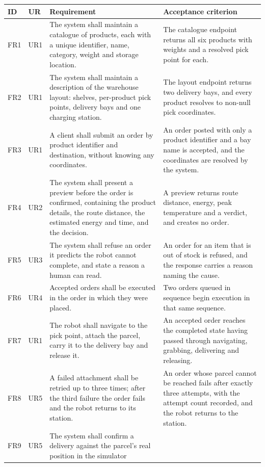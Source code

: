 \documentclass[12pt,a4paper]{report}
\begin{document}
\begin{longtable}{@{}p{}p{}p{}p{}@{}}
\toprule
\textbf{ID} & \textbf{UR} & \textbf{Requirement} & \textbf{Acceptance criterion} \\
\midrule
\endhead
FR1 & UR1 & The system shall maintain a catalogue of products, each with a unique identifier, name,
category, weight and storage location. & The catalogue endpoint returns all six products with
weights and a resolved pick point for each. \\
FR2 & UR1 & The system shall maintain a description of the warehouse layout: shelves, per-product
pick points, delivery bays and one charging station. & The layout endpoint returns two delivery
bays, and every product resolves to non-null pick coordinates. \\
FR3 & UR1 & A client shall submit an order by product identifier and destination, without knowing
any coordinates. & An order posted with only a product identifier and a bay name is accepted, and
the coordinates are resolved by the system. \\
FR4 & UR2 & The system shall present a preview before the order is confirmed, containing the
product details, the route distance, the estimated energy and time, and the decision. & A preview
returns route distance, energy, peak temperature and a verdict, and creates no order. \\
FR5 & UR3 & The system shall refuse an order it predicts the robot cannot complete, and state a
reason a human can read. & An order for an item that is out of stock is refused, and the response
carries a reason naming the cause. \\
FR6 & UR4 & Accepted orders shall be executed in the order in which they were placed. & Two orders
queued in sequence begin execution in that same sequence. \\
FR7 & UR1 & The robot shall navigate to the pick point, attach the parcel, carry it to the delivery
bay and release it. & An accepted order reaches the completed state having passed through
navigating, grabbing, delivering and releasing. \\
FR8 & UR5 & A failed attachment shall be retried up to three times; after the third failure the
order fails and the robot returns to its station. & An order whose parcel cannot be reached fails
after exactly three attempts, with the attempt count recorded, and the robot returns to the
station. \\
FR9 & UR5 & The system shall confirm a delivery against the parcel's real position in the simulator

\end{longtable}
\end{document}
